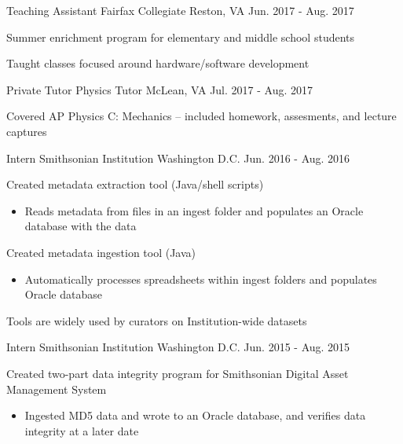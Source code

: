 \begin{cventries}
    \cventry
    {Teaching Assistant}
    {Fairfax Collegiate}
    {Reston, VA}
    {Jun. 2017 - Aug. 2017}
    {
		\begin{cvitems}
		\item{Summer enrichment program for elementary and middle school students}
		\item{Taught classes focused around hardware/software development}
		\end{cvitems}
	}
	\cventry
	{Private Tutor}
	{Physics Tutor}
	{McLean, VA}
	{Jul. 2017 - Aug. 2017}
	{
		\begin{cvitems}
		\item{Covered AP Physics C: Mechanics -- included homework, assesments, and lecture captures}
		\end{cvitems}
	}
    \cventry
    {Intern}
    {Smithsonian Institution}
    {Washington D.C.}
    {Jun. 2016 - Aug. 2016}
    {
        \begin{cvitems}
		\item{Created metadata extraction tool (Java/shell scripts)}
        \begin{itemize}
			\item{Reads metadata from files in an ingest folder and populates an Oracle database with the data}
        \end{itemize}
		\item{Created metadata ingestion tool (Java)}
        \begin{itemize}
			\item{Automatically processes spreadsheets within ingest folders and populates Oracle database}
        \end{itemize}
		\item{Tools are widely used by curators on Institution-wide datasets}
        \end{cvitems}
    }
    \cventry
    {Intern}
    {Smithsonian Institution}
    {Washington D.C.}
    {Jun. 2015 - Aug. 2015}
    {
      \begin{cvitems}
	  \item {Created two-part data integrity program for Smithsonian Digital Asset Management System}
        \begin{itemize}
			\item {Ingested MD5 data and wrote to an Oracle database, and verifies data integrity at a later date}
        \end{itemize}
      \end{cvitems}
}
\end{cventries}
